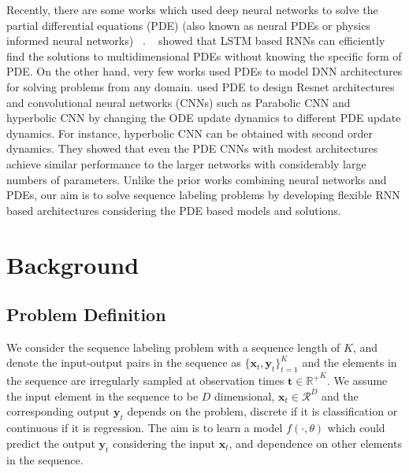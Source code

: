 \documentclass{article} %
\newcommand{\bx}{\mathbf{x}}
\newcommand{\by}{\mathbf{y}}
\newcommand{\bt}{\mathbf{t}}
\begin{document}
Recently, there are some works which used  deep neural networks to solve the  partial differential equations (PDE) (also known as neural PDEs or physics informed neural networks) ~\citep{zubov2021neuralpde,brandstetter2021message,Yihaoneuralpde}.
~\citep{Yihaoneuralpde} showed that LSTM based RNNs can efficiently find the solutions to multidimensional PDEs without knowing the specific form of PDE. On the other hand, very few works used PDEs to model DNN architectures for solving problems from any domain. \citep{RuthottoDNNpde} used PDE to design Resnet architectures and  convolutional neural networks (CNNs) such as   Parabolic CNN and  hyperbolic CNN by changing the ODE update dynamics to different PDE update dynamics.  For instance, hyperbolic CNN can be obtained with second order dynamics. They showed that even the PDE CNNs with modest architectures achieve similar performance to the larger networks with considerably large numbers of parameters. 
Unlike the prior works combining neural networks and PDEs, our aim is to solve sequence labeling problems by developing flexible RNN based architectures considering the PDE based models and solutions. 

 
\section{Background}

\subsection{Problem Definition}
We consider the sequence labeling problem with a sequence length of $K$, and denote the input-output pairs in the sequence as $\{\bx_t, \by_t\}_{t=1}^K$ and  the elements in the sequence are irregularly sampled at observation times $\bt \in \mathbb{R^+}^K$. We assume  the input element in the sequence to be  $D$ dimensional, $\bx_t \in \mathcal{R}^D$ and the  corresponding output $\by_t$ depends on the problem, discrete  if it is classification or continuous if it is  regression. The aim is to learn a model $f(\cdot, \theta)$ which could predict the output $\by_t$ considering the input $\bx_t$, and dependence on other elements in the sequence. 
\end{document}
